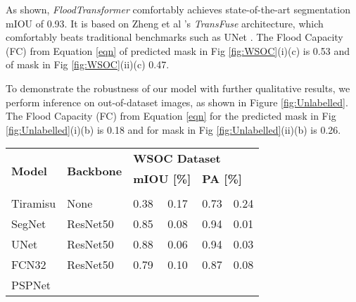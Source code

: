 \documentclass{article}
\begin{document}
As shown, \textit{FloodTransformer} comfortably achieves state-of-the-art segmentation mIOU of 0.93. It is based on Zheng et al \cite{zhang2021transfuse}'s \textit{TransFuse} architecture, which comfortably beats traditional benchmarks such as UNet \cite{unet}. The Flood Capacity (FC) from Equation \ref{eqn} of predicted mask in Fig \ref{fig:WSOC}(i)(c) is 0.53 and of mask in Fig \ref{fig:WSOC}(ii)(c) 0.47. 

To demonstrate the robustness of our model with further qualitative results, we perform inference on out-of-dataset images, as shown in Figure \ref{fig:Unlabelled}. The Flood Capacity (FC) from Equation \ref{eqn} for the predicted mask in Fig \ref{fig:Unlabelled}(i)(b) is 0.18 and for mask in Fig \ref{fig:Unlabelled}(ii)(b) is 0.26. 

\begin{table*}[]
\centering
\begin{tabular}{llllll}
\hline
\multicolumn{1}{|l|}{\multirow{3}{*}{\textbf{Model}}} &
  \multicolumn{1}{l|}{\multirow{3}{*}{\textbf{Backbone}}} &
  \multicolumn{4}{l|}{\textbf{WSOC Dataset}} \\ \cline{3-6} 
\multicolumn{1}{|l|}{} &
  \multicolumn{1}{l|}{} &
  \multicolumn{2}{l|}{\textbf{mIOU {[}\%{]}}} &
  \multicolumn{2}{l|}{\textbf{PA {[}\%{]}}} \\ \cline{3-6} 
\multicolumn{1}{|l|}{} &
  \multicolumn{1}{l|}{} &
  \multicolumn{1}{l|}{} &
  \multicolumn{1}{l|}{} &
  \multicolumn{1}{l|}{} &
  \multicolumn{1}{l|}{} \\ \hline
\multicolumn{1}{|l|}{Tiramisu \cite{tiramisu}} &
  \multicolumn{1}{l|}{None} &
  \multicolumn{1}{l|}{0.38} &
  \multicolumn{1}{l|}{0.17} &
  \multicolumn{1}{l|}{0.73} &
  \multicolumn{1}{l|}{0.24} \\ \hline
\multicolumn{1}{|l|}{SegNet \cite{segnet}} &
  \multicolumn{1}{l|}{ResNet50} &
  \multicolumn{1}{l|}{0.85} &
  \multicolumn{1}{l|}{0.08} &
  \multicolumn{1}{l|}{0.94} &
  \multicolumn{1}{l|}{0.01} \\ \hline
\multicolumn{1}{|l|}{UNet \cite{unet}} &
  \multicolumn{1}{l|}{ResNet50} &
  \multicolumn{1}{l|}{0.88} &
  \multicolumn{1}{l|}{0.06} &
  \multicolumn{1}{l|}{0.94} &
  \multicolumn{1}{l|}{0.03} \\ \hline
\multicolumn{1}{|l|}{FCN32 \cite{fcn32}} &
  \multicolumn{1}{l|}{ResNet50} &
  \multicolumn{1}{l|}{0.79} &
  \multicolumn{1}{l|}{0.10} &
  \multicolumn{1}{l|}{0.87} &
  \multicolumn{1}{l|}{0.08} \\ \hline
\multicolumn{1}{|l|}{PSPNet \cite{pspnet}} &

\end{tabular}
\end{table*}
\end{document}
